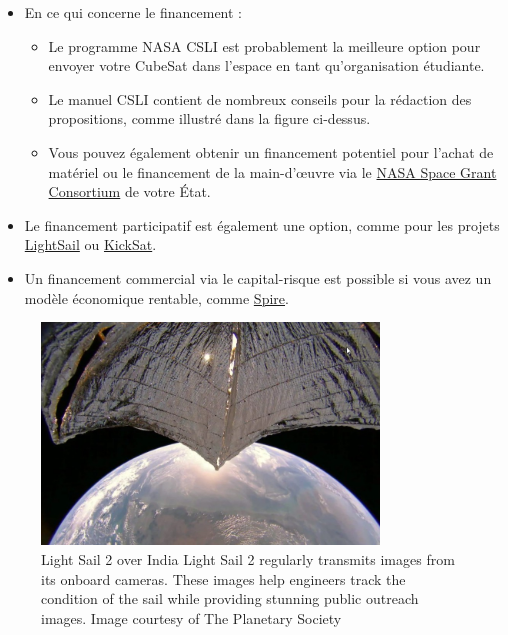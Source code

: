 \begin{itemize}
    \item En ce qui concerne le financement :
    \begin{itemize}
        \item Le programme NASA CSLI est probablement la meilleure option pour envoyer votre CubeSat dans l’espace en tant qu’organisation étudiante.  
        \item Le manuel CSLI contient de nombreux conseils pour la rédaction des propositions, comme illustré dans la figure ci-dessus.  
        \item Vous pouvez également obtenir un financement potentiel pour l’achat de matériel ou le financement de la main-d’œuvre via le \href{https://www.nasa.gov/stem/spacegrant/home/Space_Grant_Consortium_Websites.html}{NASA Space Grant Consortium} de votre État.  
    \end{itemize}
\end{itemize}
\begin{itemize}
    \item Le financement participatif est également une option, comme pour les projets \href{https://www.planetary.org/sci-tech/lightsail}{LightSail} ou \href{https://www.kickstarter.com/projects/zacinaction/kicksat-your-personal-spacecraft-in-space}{KickSat}.  
    \item Un financement commercial via le capital-risque est possible si vous avez un modèle économique rentable, comme \href{https://spire.com/}{Spire}.  
\end{itemize}
\begin{figure}[H] %
    \centering
    \includegraphics[width=0.8\textwidth]{figures/3.4.jpg}
    \caption{Light Sail 2 over India Light Sail 2 regularly transmits images from its onboard cameras. These images help engineers track the condition of the sail while providing stunning public outreach images. Image courtesy of The Planetary Society}
    \label{fig:communication2}
\end{figure}
